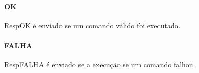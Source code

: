 \documentclass[11pt,a4paper]{article}
\begin{document}
\paragraph{\textbf{OK} \newline \newline}

RespOK é enviado se um comando válido foi executado. \\

\paragraph{\textbf{FALHA} \newline \newline}

RespFALHA é enviado se a execução se um comando falhou. \\
\end{document}
